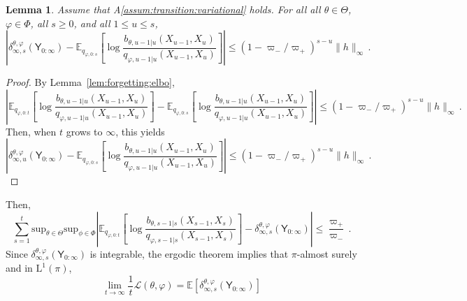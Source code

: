 \documentclass{article}
\newtheorem{lemma}[theorem]{Lemma}
\newcommand{\1}{\mathbbm{1}}
\begin{document}
\begin{lemma}
\label{lem:bound:limit}
Assume that A\ref{assum:transition:variational} holds. For all all $\theta\in\Theta$, $\varphi\in\Phi$, all $s\geq 0$, and all $1\leq u\leq s$,
$$
\left| \delta^{\theta,\varphi}_{\infty,s}(\mathsf{Y}_{0:\infty}) - \mathbb{E}_{q_{\varphi,0:s}}\left[\log \frac{b_{\theta,u-1|u}(X_{u-1},X_u)}{q_{\varphi,u-1|u}(X_{u-1},X_u)}\right] \right|\leq \left(1-\varpi_-/\varpi_+\right)^{s-u}\|h\|_\infty\,.
$$
\end{lemma}
\begin{proof}
By Lemma~\ref{lem:forgetting:elbo},
$$
\left| \mathbb{E}_{q_{\varphi,0:t}}\left[\log \frac{b_{\theta,u-1|u}(X_{u-1},X_u)}{q_{\varphi,u-1|u}(X_{u-1},X_u)}\right] - \mathbb{E}_{q_{\varphi,0:s}}\left[\log \frac{b_{\theta,u-1|u}(X_{u-1},X_u)}{q_{\varphi,u-1|u}(X_{u-1},X_u)}\right]\right|\leq \left(1-\varpi_-/\varpi_+\right)^{s-u}\|h\|_\infty\,.
$$
Then, when $t$ grows to $\infty$, this yields
$$
\left| \delta^{\theta,\varphi}_{\infty,u}(\mathsf{Y}_{0:\infty}) - \mathbb{E}_{q_{\varphi,0:s}}\left[\log \frac{b_{\theta,u-1|u}(X_{u-1},X_u)}{q_{\varphi,u-1|u}(X_{u-1},X_u)}\right]\right|\leq \left(1-\varpi_-/\varpi_+\right)^{s-u}\|h\|_\infty\,.
$$
\end{proof}
Then,
$$
\sum_{s=1}^t\mathrm{sup}_{\theta\in\Theta}\mathrm{sup}_{\phi\in\Phi}\left|\mathbb{E}_{q_{\varphi,0:t}}\left[\log \frac{b_{\theta,s-1|s}(X_{s-1},X_s)}{q_{\varphi,s-1|s}(X_{s-1},X_s)}\right]- \delta^{\theta,\varphi}_{\infty,s}(\mathsf{Y}_{0:\infty})\right| \leq \frac{\varpi_+}{\varpi_-}\,. 
$$
Since $\delta^{\theta,\varphi}_{\infty,s}(\mathsf{Y}_{0:\infty})$ is integrable, the ergodic theorem implies that $\pi$-almost surely and in $\mathrm{L}^1(\pi)$,
$$
\lim_{t\to \infty}\frac{1}{t}\mathcal{L}(\theta,\varphi) = \mathbb{E}\left[\delta^{\theta,\varphi}_{\infty,s}(\mathsf{Y}_{0:\infty})\right]
$$








 
\end{document}
